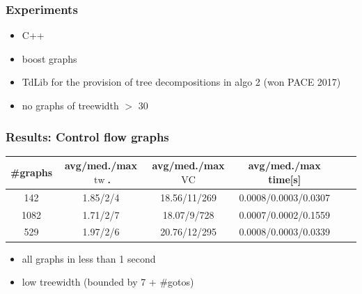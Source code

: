 \documentclass[11pt]{beamer}
\DeclareMathOperator{\tw}{tw}
\DeclareMathOperator{\VC}{VC}
\begin{document}
\begin{frame}
\frametitle{Experiments}

\begin{itemize}
\item C++
\item boost graphs
\item TdLib for the provision of tree decompositions in algo 2 (won PACE 2017)
\item no graphs of treewidth $>$ 30
\end{itemize}
\end{frame}



\begin{frame}
\frametitle{Results: Control flow graphs}

\begin{center}
\footnotesize
\begin{table}[h!]
\centering
\begin{tabular}{|c|c|c|c|c|c|}
\hline
\#graphs & avg/med./max $\tw$. & avg/med./max $\VC$ & avg/med./max time[s] \\
\hline \hline
142 & 1.85/2/4 & 18.56/11/269 & 0.0008/0.0003/0.0307 \\
\hline
1082 & 1.71/2/7 & 18.07/9/728 & 0.0007/0.0002/0.1559 \\
\hline
529 & 1.97/2/6 & 20.76/12/295 & 0.0008/0.0003/0.0339 \\
\hline
\end{tabular}
\end{table}
\end{center}

\begin{itemize}
\item all graphs in less than 1 second
\item low treewidth (bounded by 7 + \#gotos)
\end{itemize}

\end{frame}
\end{document}
